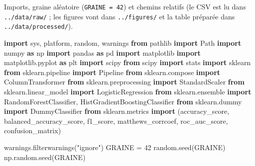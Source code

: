 \documentclass[
  10pt,
]{article}
\newenvironment{Shaded}{}{}
\newcommand{\DecValTok}[1]{\textcolor[rgb]{0.25,0.63,0.44}{#1}}
\newcommand{\ImportTok}[1]{\textcolor[rgb]{0.00,0.50,0.00}{\textbf{#1}}}
\newcommand{\NormalTok}[1]{#1}
\newcommand{\OperatorTok}[1]{\textcolor[rgb]{0.40,0.40,0.40}{#1}}
\newcommand{\StringTok}[1]{\textcolor[rgb]{0.25,0.44,0.63}{#1}}
\begin{document}
Imports, graine aléatoire (\texttt{GRAINE\ =\ 42}) et chemins relatifs
(le CSV est lu dans \texttt{../data/raw/} ; les figures vont dans
\texttt{../figures/} et la table préparée dans
\texttt{../data/processed/}).

\begin{Shaded}
\begin{Highlighting}[]
\ImportTok{import}\NormalTok{ sys, platform, random, warnings}
\ImportTok{from}\NormalTok{ pathlib }\ImportTok{import}\NormalTok{ Path}
\ImportTok{import}\NormalTok{ numpy }\ImportTok{as}\NormalTok{ np}
\ImportTok{import}\NormalTok{ pandas }\ImportTok{as}\NormalTok{ pd}
\ImportTok{import}\NormalTok{ matplotlib}
\ImportTok{import}\NormalTok{ matplotlib.pyplot }\ImportTok{as}\NormalTok{ plt}
\ImportTok{import}\NormalTok{ scipy}
\ImportTok{from}\NormalTok{ scipy }\ImportTok{import}\NormalTok{ stats}
\ImportTok{import}\NormalTok{ sklearn}
\ImportTok{from}\NormalTok{ sklearn.pipeline }\ImportTok{import}\NormalTok{ Pipeline}
\ImportTok{from}\NormalTok{ sklearn.compose }\ImportTok{import}\NormalTok{ ColumnTransformer}
\ImportTok{from}\NormalTok{ sklearn.preprocessing }\ImportTok{import}\NormalTok{ StandardScaler}
\ImportTok{from}\NormalTok{ sklearn.linear\_model }\ImportTok{import}\NormalTok{ LogisticRegression}
\ImportTok{from}\NormalTok{ sklearn.ensemble }\ImportTok{import}\NormalTok{ RandomForestClassifier, HistGradientBoostingClassifier}
\ImportTok{from}\NormalTok{ sklearn.dummy }\ImportTok{import}\NormalTok{ DummyClassifier}
\ImportTok{from}\NormalTok{ sklearn.metrics }\ImportTok{import}\NormalTok{ (accuracy\_score, balanced\_accuracy\_score, f1\_score,}
\NormalTok{                             matthews\_corrcoef, roc\_auc\_score, confusion\_matrix)}

\NormalTok{warnings.filterwarnings(}\StringTok{"ignore"}\NormalTok{)}
\NormalTok{GRAINE }\OperatorTok{=} \DecValTok{42}
\NormalTok{random.seed(GRAINE)}
\NormalTok{np.random.seed(GRAINE)}


\end{Highlighting}
\end{Shaded}
\end{document}
